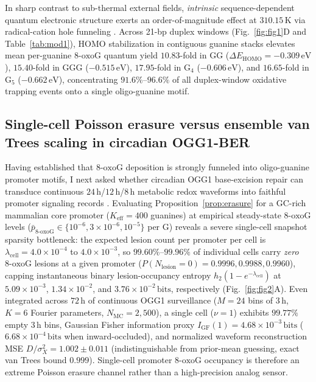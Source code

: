 \documentclass[10pt,letterpaper]{article}
\theoremstyle{plain}
\theoremstyle{definition}
\newcommand{\oxog}{\text{8-oxoG}}
\begin{document}
In sharp contrast to sub-thermal external fields, \emph{intrinsic} sequence-dependent quantum electronic structure exerts an order-of-magnitude effect at $310.15\,\mathrm{K}$ via radical-cation hole funneling \cite{rokhlenko2014jacs,rooman2014ioniz}. Across 21-bp duplex windows (Fig.~\ref{fig:fig1}D and Table~\ref{tab:mod1}), HOMO stabilization in contiguous guanine stacks elevates mean per-guanine $\oxog$ quantum yield $10.83$-fold in $\mathrm{GG}$ ($\Delta E_{\mathrm{HOMO}} = -0.309\,\mathrm{eV}$), $15.40$-fold in $\mathrm{GGG}$ ($-0.515\,\mathrm{eV}$), $17.95$-fold in $\mathrm{G}_4$ ($-0.606\,\mathrm{eV}$), and $16.65$-fold in $\mathrm{G}_5$ ($-0.662\,\mathrm{eV}$), concentrating $91.6\%$--$96.6\%$ of all duplex-window oxidative trapping events onto a single oligo-guanine motif.

\subsection*{Single-cell Poisson erasure versus ensemble van Trees scaling in circadian OGG1-BER}

Having established that $\oxog$ deposition is strongly funneled into oligo-guanine promoter motifs, I next asked whether circadian OGG1 base-excision repair can transduce continuous $24\,\mathrm{h}$/$12\,\mathrm{h}$/$8\,\mathrm{h}$ metabolic redox waveforms into faithful promoter signaling records \cite{obermann2024redox,hahm2022emm,wang2025jbiomedsci}. Evaluating Proposition~\ref{prop:erasure} for a GC-rich mammalian core promoter ($K_{\mathrm{eff}} = 400$ guanines) at empirical steady-state $\oxog$ levels ($\bar{p}_{\oxog} \in \{10^{-6}, 3\times 10^{-6}, 10^{-5}\}$ per G) reveals a severe single-cell snapshot sparsity bottleneck: the expected lesion count per promoter per cell is $\lambda_{\mathrm{cell}} = 4.0 \times 10^{-4}$ to $4.0 \times 10^{-3}$, so $99.60\%$--$99.96\%$ of individual cells carry \emph{zero} $\oxog$ lesions at a given promoter ($P(N_{\mathrm{lesion}}=0) = 0.9996, 0.9988, 0.9960$), capping instantaneous binary lesion-occupancy entropy $h_2(1 - e^{-\lambda_{\mathrm{cell}}})$ at $5.09 \times 10^{-3}$, $1.34 \times 10^{-2}$, and $3.76 \times 10^{-2}\,\mathrm{bits}$, respectively (Fig.~\ref{fig:fig2}A). Even integrated across $72\,\mathrm{h}$ of continuous OGG1 surveillance ($M=24$ bins of $3\,\mathrm{h}$, $K=6$ Fourier parameters, $N_{\mathrm{MC}} = 2{,}500$), a single cell ($\nu = 1$) exhibits $99.77\%$ empty $3\,\mathrm{h}$ bins, Gaussian Fisher information proxy $I_{\mathrm{GF}}(1) = 4.68 \times 10^{-3}\,\mathrm{bits}$ ($6.68 \times 10^{-4}\,\mathrm{bits}$ when inward-occluded), and normalized waveform reconstruction MSE $D/\sigma_X^2 = 1.002 \pm 0.011$ (indistinguishable from prior-mean guessing, exact van Trees bound $0.999$). Single-cell promoter $\oxog$ occupancy is therefore an extreme Poisson erasure channel rather than a high-precision analog sensor.
\end{document}
